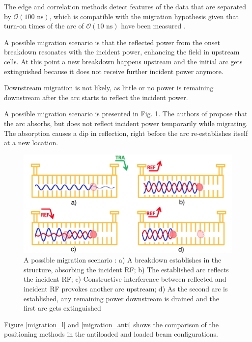 The edge and correlation methods detect features of the data that are separated by $\mathcal{O}(100 \text{ ns})$, which is compatible with the migration hypothesis given that turn-on times of the arc of $\mathcal{O}(10 \text{ ns})$ have been measured \cite{Shipman:1999457,Shipman:1459884}.





A possible migration scenario is that the reflected power from the onset breakdown resonates with the incident power, enhancing the field in upstream cells. At this point a new breakdown happens upstream and the initial arc gets extinguished because it does not receive further incident power anymore. 

Downstream migration is not likely, as little or no power is remaining downstream after the arc starts to reflect the incident power. 

A possible migration scenario is presented in Fig.  \ref{mig_sc}. The authors of \cite{Degiovanni:migration} propose that the arc absorbs, but does not reflect incident power temporarily while migrating. The absorption causes a dip in reflection, right before the arc re-establishes itself at a new location.

\begin{figure}[h]
\centering 
\includegraphics[scale=0.3]{pictures/migration_scenario}
\caption{A possible migration scenario \cite{Degiovanni:migration}: a) A breakdown establishes in the structure, absorbing the incident RF; b) The established arc reflects the incident RF; c) Constructive interference between reflected and incident RF provokes another arc upstream; d) As the second arc is established, any remaining power downstream is drained and the first arc gets extinguished}
\label{mig_sc}
\end{figure}

Figure \ref{migration_l} and \ref{migration_anti} shows the comparison of the positioning methods in the antiloaded and loaded beam configurations.  

